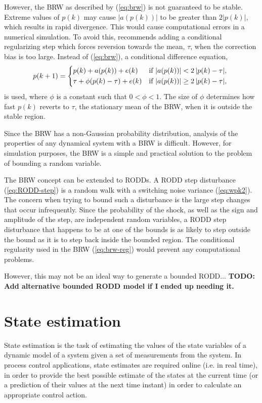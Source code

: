 However, the BRW as described by (\ref{eq:brw}) is not guaranteed to be stable. Extreme values of $p(k)$ may cause $|a(p(k))|$ to be greater than $2|p(k)|$, which results in rapid divergence. This would cause computational errors in a numerical simulation. To avoid this, \cite{nicolau_stationary_2002} recommends adding a conditional regularizing step which forces reversion towards the mean, $\tau$, when the correction bias is too large. Instead of (\ref{eq:brw}), a conditional difference equation,
\begin{equation} \label{eq:brw-reg}
	p(k+1) = \begin{cases*}
		p(k) + a(p(k)) + e(k) & if $\left|a(p(k)) \right| < 2\left| p(k) - \tau \right|$, \\
		\tau + \phi(p(k) - \tau) + e(k) & if $\left|a(p(k)) \right| \geq 2\left| p(k) - \tau \right|$,
	\end{cases*}
\end{equation}
is used, where $\phi$ is a constant such that $0<\phi<1$. The size of $\phi$ determines how fast $p(k)$ reverts to $\tau$, the stationary mean of the BRW, when it is outside the stable region.

Since the BRW has a non-Gaussian probability distribution, analysis of the properties of any dynamical system with a BRW is difficult. However, for simulation purposes, the BRW is a simple and practical solution to the problem of bounding a random variable.

The BRW concept can be extended to RODDs. A RODD step disturbance (\ref{eq:RODD-step}) is a random walk with a switching noise variance (\ref{eq:wpk2}). The concern when trying to bound such a disturbance is the large step changes that occur infrequently. Since the probability of the shock, as well as the sign and amplitude of the step, are independent random variables, a RODD step disturbance that happens to be at one of the bounds is as likely to step outside the bound as it is to step back inside the bounded region. The conditional regularity used in the BRW (\ref{eq:brw-reg}) would prevent any computational problems. 

However, this may not be an ideal way to generate a bounded RODD... \textbf{TODO: Add alternative bounded RODD model if I ended up needing it.}


\section{State estimation}

State estimation is the task of estimating the values of the state variables of a dynamic model of a system given a set of measurements from the system. In process control applications, state estimates are required online (i.e. in real time), in order to provide the best possible estimate of the states at the current time (or a prediction of their values at the next time instant) in order to calculate an appropriate control action.

